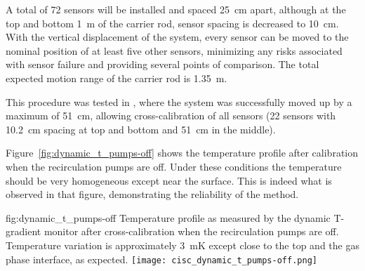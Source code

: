A total of \num{72} sensors will be installed and spaced \SI{25}{cm} apart, although at the top and bottom \SI{1}{m} of the carrier rod, sensor spacing is decreased to \SI{10}{cm}.  
 With the vertical displacement of the system, every sensor can be moved to the nominal position of at least five other sensors, minimizing any risks associated with sensor failure and providing several points of comparison. The total expected motion range of the carrier rod is \SI{1.35}{m}.


This procedure was tested in , where the system was successfully moved up by a maximum of \SI{51}{cm}, allowing cross-calibration of all sensors (22 sensors with \SI{10.2}{cm} spacing at top and bottom and \SI{51}{cm} in the middle). 


Figure~\ref{fig:dynamic_t_pumps-off} shows the temperature profile after calibration when the recirculation pumps are off. Under these conditions the  temperature should be very homogeneous except near the surface. This is indeed what is observed in that figure, demonstrating the reliability of the method.  

\begin{dunefigure}{fig:dynamic_t_pumps-off}
  {Temperature profile as measured by the dynamic T-gradient monitor after cross-calibration when the recirculation pumps are off. Temperature variation is approximately \SI{3}{mK} except close to the top and the gas phase interface, as expected.}
  \texttt{[image: cisc\_dynamic\_t\_pumps-off.png]}%
\end{dunefigure}



